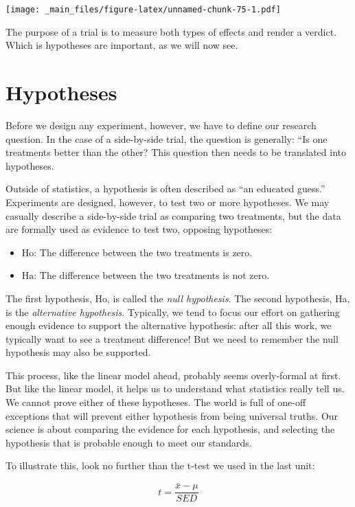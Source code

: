 \documentclass[
]{book}
\providecommand{\tightlist}{%
  \setlength{\itemsep}{0pt}\setlength{\parskip}{0pt}}
\begin{document}
\texttt{[image: \_main\_files/figure-latex/unnamed-chunk-75-1.pdf]}

The purpose of a trial is to measure both types of effects and render a verdict. Which is hypotheses are important, as we will now see.

\hypertarget{hypotheses}{%
\section{Hypotheses}\label{hypotheses}}

Before we design any experiment, however, we have to define our research question. In the case of a side-by-side trial, the question is generally: ``Is one treatments better than the other? This question then needs to be translated into hypotheses.

Outside of statistics, a hypothesis is often described as ``an educated guess.'' Experiments are designed, however, to test two or more hypotheses. We may casually describe a side-by-side trial as comparing two treatments, but the data are formally used as evidence to test two, opposing hypotheses:

\begin{itemize}
\tightlist
\item
  Ho: The difference between the two treatments is zero.
\item
  Ha: The difference between the two treatments is not zero.
\end{itemize}

The first hypothesis, Ho, is called the \emph{null hypothesis}. The second hypothesis, Ha, is the \emph{alternative hypothesis}. Typically, we tend to focus our effort on gathering enough evidence to support the alternative hypothesis: after all this work, we typically want to see a treatment difference! But we need to remember the null hypothesis may also be supported.

This process, like the linear model ahead, probably seems overly-formal at first. But like the linear model, it helps us to understand what statistics really tell us. We cannot prove either of these hypotheses. The world is full of one-off exceptions that will prevent either hypothesis from being universal truths. Our science is about comparing the evidence for each hypothesis, and selecting the hypothesis that is probable enough to meet our standards.

To illustrate this, look no further than the t-test we used in the last unit:

\[ t = \frac{\bar{x}-\mu}{SED} \]
\end{document}
